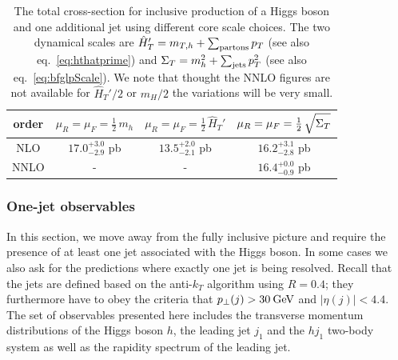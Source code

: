 \begin{table}
  \centering
  \begin{tabular}{c||c|c|c}
    order \vphantom{$\int\limits_a^b$} & $\mu_R=\mu_F=\tfrac{1}{2}\,m_h$ & $\mu_R=\mu_F=\tfrac{1}{2}\,\hat{H}_T'$ & $\mu_R=\mu_F=\tfrac{1}{2}\,\sqrt{\vphantom{\big[}\Sigma_T}$ \\
    \hline\hline
    NLO \vphantom{$\int\limits_a^b$}  & $17.0^{+3.0}_{-2.9}$ pb & $13.5^{+2.0}_{-2.1}$ pb & $16.2^{+3.1}_{-2.8}$ pb \\\hline
    NNLO \vphantom{$\int\limits_a^b$} & -     & -     & $16.4^{+0.0}_{-0.9}$ pb \\
    \hline
  \end{tabular}
  \caption{
    The total cross-section for inclusive production of a Higgs boson and 
    one additional jet using different core scale choices.  The two 
    dynamical scales are $\hat{H}_T'=m_{T,h} + \sum_{\rm partons} p_T$ 
    (see also eq.~\eqref{eq:hthatprime}) and 
    $\Sigma_T = m_h^2 + \sum_{\rm jets} p_T^2$ 
    (see also eq.~\eqref{eq:bfglpScale}). We note that thought the NNLO figures
    are not available for $\hat{H}_T'/2$ or $m_H/2$ the variations will be very small.
  }
  \label{tab:H1jXS}
\end{table}


\subsubsection{One-jet observables}
\label{sec:hjetscomp:results:1jobs}

In this section, we move away from the fully inclusive picture and
require the presence of at least one jet associated with the Higgs
boson. In some cases we also ask for the predictions where exactly one
jet is being resolved. Recall that the jets are defined based on the
anti-$k_T$ algorithm using $R=0.4$; they furthermore have to obey the
criteria that $p_\perp(j)>30\text{\:GeV}$ and $|\eta(j)|<4.4$. The set of
observables presented here includes the transverse momentum
distributions of the Higgs boson $h$, the leading jet $j_1$ and the
$hj_1$ two-body system as well as the rapidity spectrum of the leading
jet.


